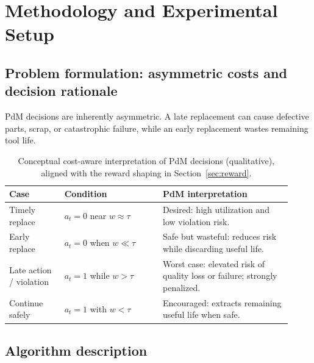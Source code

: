 \documentclass[sn-basic]{sn-jnl} %
\begin{document}
\section{Methodology and Experimental Setup}
\label{sec:method}
\subsection{Problem formulation: asymmetric costs and decision rationale}
\label{sec:problem}
PdM decisions are inherently asymmetric. A late replacement can cause defective parts, scrap, or catastrophic failure, while an early replacement wastes remaining tool life.

\begin{table}[t]
        \centering
        \caption{Conceptual cost-aware interpretation of PdM decisions (qualitative), aligned with the reward shaping in Section~\ref{sec:reward}.}
        \label{tab:cost_view}
        \begin{tabular}{p{0.18\linewidth} p{0.32\linewidth} p{0.42\linewidth}}
                \toprule
                \textbf{Case} & \textbf{Condition} & \textbf{PdM interpretation}\\
                \midrule
                Timely replace & $a_t=0$ near $w\approx\tau$ & Desired: high utilization and low violation risk.\\
                Early replace & $a_t=0$ when $w\ll\tau$ & Safe but wasteful: reduces risk while discarding useful life.\\
                Late action / violation & $a_t=1$ while $w>\tau$ & Worst case: elevated risk of quality loss or failure; strongly penalized.\\
                Continue safely & $a_t=1$ with $w<\tau$ & Encouraged: extracts remaining useful life when safe.\\
                \bottomrule
        \end{tabular}
\end{table}

\subsection{Algorithm description}
\label{sec:algo_desc}
\end{document}
